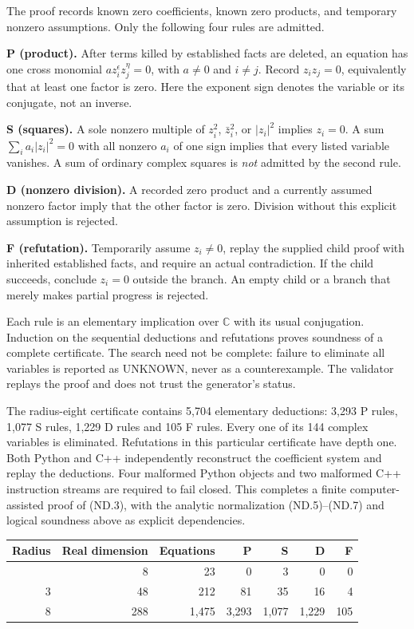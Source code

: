 The proof records known zero coefficients, known zero products, and temporary nonzero assumptions. Only the following four rules are admitted.

\textbf{P (product).} After terms killed by established facts are deleted, an equation has one cross monomial \(a z_i^{\epsilon}z_j^{\eta}=0\), with \(a\ne0\) and \(i\ne j\). Record \(z_i z_j=0\), equivalently that at least one factor is zero. Here the exponent sign denotes the variable or its conjugate, not an inverse.

\textbf{S (squares).} A sole nonzero multiple of \(z_i^2\), \(\bar z_i^2\), or \(|z_i|^2\) implies \(z_i=0\). A sum \(\sum_i a_i|z_i|^2=0\) with all nonzero \(a_i\) of one sign implies that every listed variable vanishes. A sum of ordinary complex squares is \emph{not} admitted by the second rule.

\textbf{D (nonzero division).} A recorded zero product and a currently assumed nonzero factor imply that the other factor is zero. Division without this explicit assumption is rejected.

\textbf{F (refutation).} Temporarily assume \(z_i\ne0\), replay the supplied child proof with inherited established facts, and require an actual contradiction. If the child succeeds, conclude \(z_i=0\) outside the branch. An empty child or a branch that merely makes partial progress is rejected.

Each rule is an elementary implication over \(\mathbb C\) with its usual conjugation. Induction on the sequential deductions and refutations proves soundness of a complete certificate. The search need not be complete: failure to eliminate all variables is reported as UNKNOWN, never as a counterexample. The validator replays the proof and does not trust the generator's status.

The radius-eight certificate contains 5,704 elementary deductions: 3,293 P rules, 1,077 S rules, 1,229 D rules and 105 F rules. Every one of its 144 complex variables is eliminated. Refutations in this particular certificate have depth one. Both Python and C++ independently reconstruct the coefficient system and replay the deductions. Four malformed Python objects and two malformed C++ instruction streams are required to fail closed. This completes a finite computer-assisted proof of (ND.3), with the analytic normalization (ND.5)--(ND.7) and logical soundness above as explicit dependencies.

\begin{longtable}[]{@{}rrrrrrr@{}}
\toprule\noalign{}
Radius & Real dimension & Equations & P & S & D & F \\
\midrule\noalign{}
\endhead
\bottomrule\noalign{}
\endlastfoot
1 & 8 & 23 & 0 & 3 & 0 & 0 \\
3 & 48 & 212 & 81 & 35 & 16 & 4 \\
8 & 288 & 1,475 & 3,293 & 1,077 & 1,229 & 105 \\
\end{longtable}

